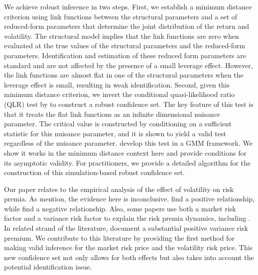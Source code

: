 \documentclass[11pt, letterpaper, twoside]{article}
\begin{document}
We achieve robust inference in two steps. First, we establish a minimum distance criterion using link functions between the structural parameters and a set of reduced-form parameters that determine the joint distribution of the return and volatility. The structural model implies that the link functions are zero when evaluated at the true values of the structural parameters and the reduced-form parameters. Identification and estimation of these reduced form parameters are standard and are not affected by the presence of a small leverage effect. However, the link functions are almost flat in one of the structural parameters when the leverage effect is small, resulting in weak identification. Second, given this minimum distance criterion, we invert the conditional quasi-likelihood ratio (QLR) test by \textcite{andrews2016conditional} to construct a robust confidence set. The key feature of this test is that it treats the flat link functions as an infinite dimensional nuisance parameter. The critical value is constructed by conditioning on a sufficient statistic for this nuisance parameter, and it is shown to yield a valid test regardless of the nuisance parameter. \Textcite{andrews2016conditional} develop this test in a GMM framework. We show it works in the minimum distance context here and provide conditions for its asymptotic validity. For practitioners, we provide a detailed algorithm for the construction of this simulation-based robust confidence set.


Our paper relates to the empirical analysis of the effect of volatility on risk premia. As \textcite{lettau2010measuring} mention,  the evidence here is inconclusive. \textcites{bollerslev1988capital, harvey1989timevarying, ghysels2005there, bali2006there, ludvigson2007empirical} find a positive relationship, while \textcites{campbell1987stock, breen1989economic, pagan1991nonparametric, whitelaw1994time, brandt2004relationship} find a negative relationship. Also, some papers use both a market risk factor and a variance risk factor to explain the risk premia dynamics, including \textcites{christoffersen2013capturing, feunou2014risk, dewbecker2017price}. In related strand of the literature, \textcite{bollerslev2008risk, drechsler2011whats} document a substantial positive variance risk premium. We contribute to this literature by providing the first method for making valid inference for the market risk price and the volatility risk price. This new confidence set not only allows for both effects but also takes into account the potential identification issue.
\end{document}
